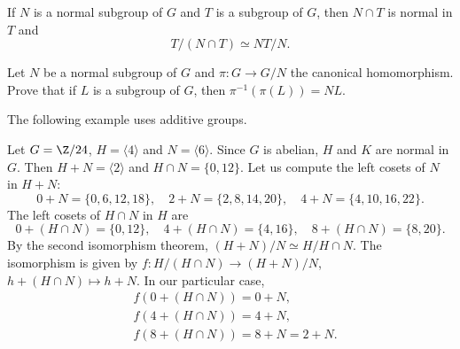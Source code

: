 \begin{exercise}
If $N$ is a normal subgroup of $G$ and 
$T$ is a subgroup of $G$, then $N\cap T$ is normal in $T$
and 
\[
T/(N\cap T)\simeq NT/N.
\]
\end{exercise}



\begin{exercise}
Let $N$ be a normal subgroup of $G$ and
$\pi\colon G\to G/N$ the canonical homomorphism. Prove that
if $L$ is a subgroup of $G$, then $\pi^{-1}(\pi(L))=NL$.
\end{exercise}

The following example uses additive groups. 

\begin{example}
\label{exa:Z24}
Let $G=\Z/24$, $H=\langle 4\rangle$ and $N=\langle 6\rangle$. Since $G$ is abelian, $H$ and $K$ are normal in $G$. Then 
$H+N=\langle 2\rangle$ and $H\cap N=\{0,12\}$. Let us compute
the left cosets of $N$ in $H+N$:
\[
0+N=\{0,6,12,18\},
\quad
2+N=\{2,8,14,20\},
\quad
4+N=\{4,10,16,22\}.
\]
The left cosets of $H\cap N$ in $H$ are 
\[
0+(H\cap N)=\{0,12\},
\quad
4+(H\cap N)=\{4,16\},
\quad
8+(H\cap N)=\{8,20\}.
\]
By the second isomorphism theorem, $(H+N)/N\simeq H/H\cap N$. The
isomorphism is given by 
$f\colon H/(H\cap N)\to (H+N)/N$, $h+(H\cap N)\mapsto h+N$.
In our particular case, 
\begin{align*}
&f(0+(H\cap N))=0+N,\\
&f(4+(H\cap N))=4+N,\\
&f(8+(H\cap N))=8+N=2+N.
\end{align*}
\end{example}

